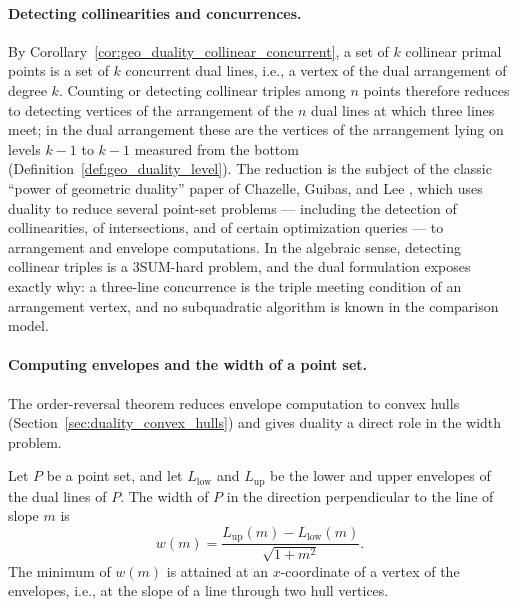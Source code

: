 \paragraph{Detecting collinearities and concurrences.}
By Corollary~\ref{cor:geo_duality_collinear_concurrent}, a set of $k$
collinear primal points is a set of $k$ concurrent dual lines, i.e., a
vertex of the dual arrangement of degree $k$. Counting or detecting
collinear triples among $n$ points therefore reduces to detecting vertices
of the arrangement of the $n$ dual lines at which three lines meet; in the
dual arrangement these are the vertices of the arrangement lying on levels
$k - 1$ to $k - 1$ measured from the bottom (Definition~\ref{def:geo_duality_level}).
The reduction is the subject of the classic ``power of geometric duality''
paper of Chazelle, Guibas, and Lee \cite{chazelle1985power}, which uses
duality to reduce several point-set problems --- including the detection of
collinearities, of intersections, and of certain optimization queries --- to
arrangement and envelope computations. In the algebraic sense, detecting
collinear triples is a 3SUM-hard problem, and the dual formulation exposes
exactly why: a three-line concurrence is the triple meeting condition of an
arrangement vertex, and no subquadratic algorithm is known in the
comparison model.

\paragraph{Computing envelopes and the width of a point set.}
The order-reversal theorem reduces envelope computation to convex hulls
(Section~\ref{sec:duality_convex_hulls}) and gives duality a direct role in
the width problem.

\begin{theorem}\label{thm:geo_duality_width}
  Let $P$ be a point set, and let $L_{\text{low}}$ and $L_{\text{up}}$ be
  the lower and upper envelopes of the dual lines of $P$. The width of $P$
  in the direction perpendicular to the line of slope $m$ is
  \[
    w(m) = \frac{L_{\text{up}}(m) - L_{\text{low}}(m)}{\sqrt{1 + m^2}} .
  \]
  The minimum of $w(m)$ is attained at an $x$-coordinate of a vertex of the
  envelopes, i.e., at the slope of a line through two hull vertices.
\end{theorem}

